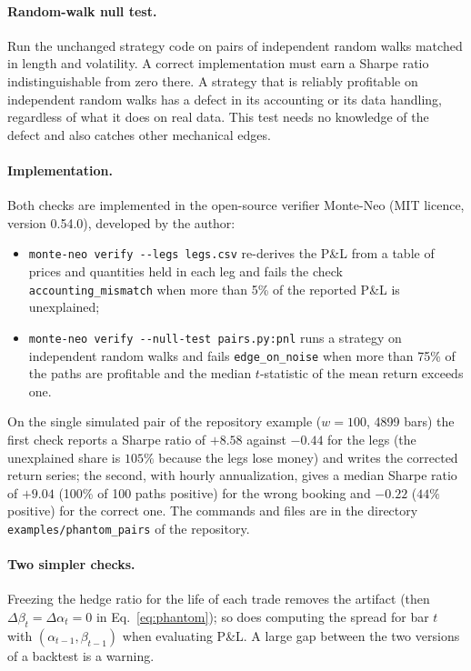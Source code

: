 \documentclass[11pt]{article}
\theoremstyle{remark}
\begin{document}
\paragraph{Random-walk null test.} Run the unchanged strategy code on pairs of independent random walks matched
in length and volatility. A correct implementation must earn a Sharpe ratio indistinguishable from zero there.
A strategy that is reliably profitable on independent random walks has a defect in its accounting or its data
handling, regardless of what it does on real data. This test needs no knowledge of the defect and also catches
other mechanical edges.

\paragraph{Implementation.} Both checks are implemented in the open-source verifier Monte-Neo (MIT licence, version
0.54.0), developed by the author:
\begin{itemize}
\item \texttt{monte-neo verify -{}-legs legs.csv} re-derives the P\&L from a table of prices and quantities held in each
leg and fails the check \texttt{accounting\_mismatch} when more than 5\% of the reported P\&L is unexplained;
\item \texttt{monte-neo verify -{}-null-test pairs.py:pnl} runs a strategy on independent random walks and fails
\texttt{edge\_on\_noise} when more than 75\% of the paths are profitable and the median $t$-statistic of the mean return
exceeds one.
\end{itemize}
On the single simulated pair of the repository example ($w=100$, 4899 bars) the first check reports a Sharpe ratio of
$+8.58$ against $-0.44$ for the legs (the unexplained share is $105\%$ because the legs lose money) and writes the
corrected return series; the second, with hourly annualization, gives a median Sharpe ratio of $+9.04$ (100\% of 100 paths
positive) for the wrong booking and $-0.22$ ($44\%$ positive) for the correct one. The commands and files are in the
directory \texttt{examples/phantom\_pairs} of the repository.

\paragraph{Two simpler checks.} Freezing the hedge ratio for the life of each trade removes the artifact (then $\Delta\beta_t=\Delta\alpha_t=0$ in Eq.~\eqref{eq:phantom}); so does
computing the spread for bar $t$ with $(\alpha_{t-1},\beta_{t-1})$ when evaluating P\&L. A large gap between the
two versions of a backtest is a warning.
\end{document}
